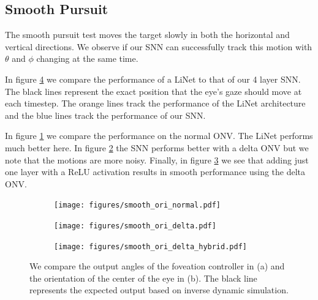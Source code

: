 \documentclass[../taasin.tex]{subfiles}
\begin{document}

\subsection{Smooth Pursuit}

The smooth pursuit test moves the target slowly in both the horizontal and vertical directions. We observe if our SNN can successfully track this motion with $\theta$ and $\phi$ changing at the same time.

In figure \ref{fig:smooth} we compare the performance of a LiNet to that of our 4 layer SNN. The black lines represent the exact position that the eye's gaze should move at each timestep. The orange lines track the performance of the LiNet architecture and the blue lines track the performance of our SNN. 

In figure \ref{fig:smooth_normal} we compare the performance on the normal ONV. The LiNet performs much better here. In figure \ref{fig:smooth_delta} the SNN performs better with a delta ONV but we note that the motions are more noisy. Finally, in figure \ref{fig:smooth_hybrid} we see that adding just one layer with a ReLU activation results in smooth performance using the delta ONV.

\begin{figure}
    \centering

    \begin{subfigure}[b]{0.5\textwidth}
        \centering
        \texttt{[image: figures/smooth\_ori\_normal.pdf]}
        \caption{}
        \label{fig:smooth_normal}
    \end{subfigure}

    \hfill

    \begin{subfigure}[b]{0.5\textwidth}
        \centering
        \texttt{[image: figures/smooth\_ori\_delta.pdf]}
        \caption{}
        \label{fig:smooth_delta}
    \end{subfigure}

    \hfill

    \begin{subfigure}[b]{0.5\textwidth}
        \centering
        \texttt{[image: figures/smooth\_ori\_delta\_hybrid.pdf]}
        \caption{}
        \label{fig:smooth_hybrid}
    \end{subfigure}

    \caption{We compare the output angles of the foveation controller in (a) and the orientation of the center of the eye in (b). The black line represents the expected output based on inverse dynamic simulation.}
    \label{fig:smooth}
\end{figure}
\end{document}
